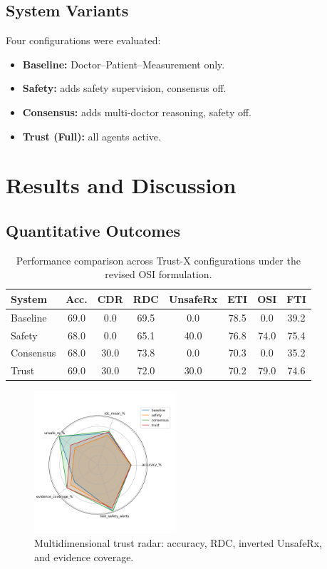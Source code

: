 \documentclass[letterpaper]{article} %
\begin{document}
\subsection{System Variants}
Four configurations were evaluated:
\begin{itemize}
    \item \textbf{Baseline:} Doctor–Patient–Measurement only.
    \item \textbf{Safety:} adds safety supervision, consensus off.
    \item \textbf{Consensus:} adds multi-doctor reasoning, safety off.
    \item \textbf{Trust (Full):} all agents active.
\end{itemize}

\section{Results and Discussion}
\label{sec:results}

\subsection{Quantitative Outcomes}

\begin{table}[t]
\centering
\caption{Performance comparison across Trust-X configurations under the revised OSI formulation.}
\label{tab:results_summary}

\begin{tabular}{lccccccc}
\toprule
System & Acc. & CDR & RDC & UnsafeRx & ETI & OSI & FTI \\
\midrule
Baseline  & 69.0 & 0.0 & 69.5 & 0.0 & 78.5 & 0.0 & 39.2 \\
Safety    & 68.0 & 0.0 & 65.1 & 40.0 & 76.8 & 74.0 & 75.4 \\
Consensus & 68.0 & 30.0 & 73.8 & 0.0 & 70.3 & 0.0 & 35.2 \\
Trust     & 69.0 & 30.0 & 72.0 & 30.0 & 70.2 & 79.0 & 74.6 \\
\bottomrule
\end{tabular}
\end{table}

\begin{figure}[t]
\centering
\includegraphics[width=0.47\textwidth]{fig5_trust_radar.png}
\caption{Multidimensional trust radar: accuracy, RDC, inverted UnsafeRx, and evidence coverage.}
\label{fig:trust_radar}
\end{figure}
\end{document}
